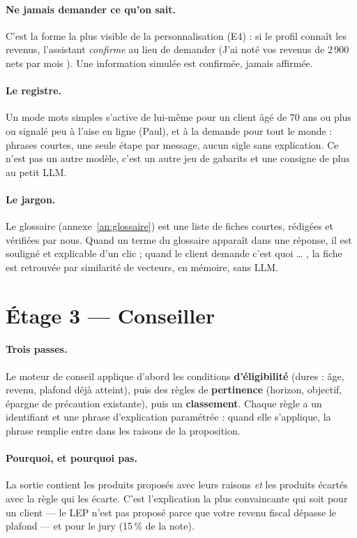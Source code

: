 \paragraph{Ne jamais demander ce qu'on sait.} C'est la forme la plus visible de la
personnalisation (E4) : si le profil connaît les revenus, l'assistant \emph{confirme} au lieu de
demander (\og J'ai noté vos revenus de 2\,900\eur{} nets par mois \fg). Une information simulée
est confirmée, jamais affirmée.

\paragraph{Le registre.} Un mode \og mots simples \fg{} s'active de lui-même pour un client âgé de
70 ans ou plus ou signalé \og peu à l'aise en ligne \fg{} (Paul), et à la demande pour tout le
monde : phrases courtes, une seule étape par message, aucun sigle sans explication. Ce n'est pas un
autre modèle, c'est un autre jeu de gabarits et une consigne de plus au petit LLM.

\paragraph{Le jargon.} Le glossaire (annexe~\ref{an:glossaire}) est une liste de fiches courtes,
rédigées et vérifiées par nous. Quand un terme du glossaire apparaît dans une réponse, il est
souligné et explicable d'un clic ; quand le client demande \og c'est quoi \dots{} \fg, la fiche est
retrouvée par similarité de vecteurs, en mémoire, sans LLM.

\section{Étage 3 --- Conseiller}

\paragraph{Trois passes.} Le moteur de conseil applique d'abord les conditions
\textbf{d'éligibilité} (dures : âge, revenu, plafond déjà atteint), puis des règles de
\textbf{pertinence} (horizon, objectif, épargne de précaution existante), puis un
\textbf{classement}. Chaque règle a un identifiant et une phrase d'explication paramétrée : quand
elle s'applique, la phrase remplie entre dans les raisons de la proposition.

\paragraph{Pourquoi, et pourquoi pas.} La sortie contient les produits proposés avec leurs raisons
\emph{et} les produits écartés avec la règle qui les écarte. C'est l'explication la plus
convaincante qui soit pour un client --- \og le LEP n'est pas proposé parce que votre revenu fiscal
dépasse le plafond \fg{} --- et pour le jury (15\,\% de la note).

